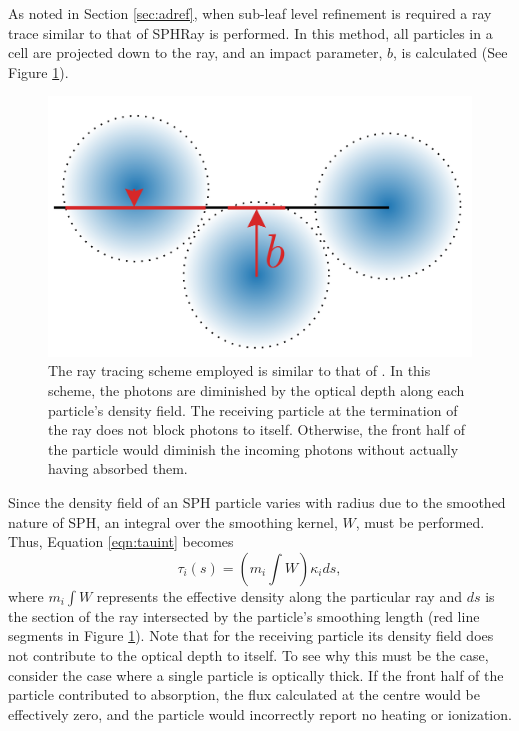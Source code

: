 \documentclass[fleq,usenatbib]{mnras}
\begin{document}
{As noted in Section \ref{sec:adref}, when sub-leaf level 
refinement is required a ray trace similar to that of 
SPHRay is performed. In this method, all particles in a cell are projected 
down to the ray, and an impact parameter, $b$, is calculated (See Figure
\ref{fig:raytrace}).
\begin{figure}
\includegraphics[width=1\linewidth]{Figures/raytrace.pdf}
\caption{The ray tracing scheme employed is similar to that of 
\protect\cite{altayEt08}. In this scheme, the photons are diminished by the 
optical depth along each particle's density field. The receiving particle at 
the termination of the ray does not block photons to itself. Otherwise, the front half 
of the particle would diminish the incoming photons without actually having 
absorbed them.} 
\label{fig:raytrace}
\end{figure}
Since the density field of an SPH particle varies with radius due to the 
smoothed nature of SPH, an integral over the smoothing kernel, $W$, must be 
performed. Thus, Equation \ref{eqn:tauint} becomes 
\begin{equation}
\tau_i(s) = \left(m_i\int W\right) \kappa_i ds,
\end{equation}
where $m_i \int W$ represents the effective density along the particular ray 
and $ds$ is the section of the ray intersected by the particle's smoothing 
length (red line segments in Figure \ref{fig:raytrace}). Note that for the 
receiving particle its density field does not contribute to the optical depth
to itself.  
To see why this must be the case, consider the case where a single particle is
optically thick. If the front half of the particle contributed to absorption,
the flux calculated at the centre would be effectively zero, and the particle 
would incorrectly report no heating or ionization. 

}
\end{document}

